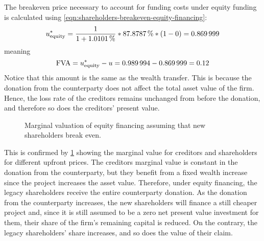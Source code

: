 \documentclass[main.tex]{subfiles}
\begin{document}
        The breakeven price necessary to account for funding costs under equity funding is calculated using
        \cref{eqn:shareholders-breakeven-equity-financing}:
            \begin{equation*}
                    u^{\ast}_{\text{equity}} 
                =
                    \frac{1}{1 + \pct{0.010101}} 
                    *
                    \pct{0.878787}
                    *
                    \left(
                        \num{1}
                        -
                        \num{0}
                    \right)
                =
                    \num{0.869999}
            \end{equation*}
        meaning 
        \begin{equation*}
            \FVA/ = u^{\ast}_{\text{equity}} - u =
            \num{0.989994}-\num{0.869999} =
            \num{0.12}
        \end{equation*}
        Notice that this amount is the same as the wealth transfer.
        This is because the donation from the counterparty does not affect the total asset value of the firm.
        Hence, the loss rate of the creditors remains unchanged from before the donation, and therefore so does the creditors' present value.

        \begin{figure}
            \centering
            \resizebox{\textwidth}{!}{%
                
            }
            \caption{
                Marginal valuation of equity financing 
                assuming that new shareholders break even.
            }
            \label{fig:marginal-value-equity-financing}
        \end{figure}

        This is confirmed by \cref{fig:marginal-value-equity-financing} showing
        the marginal value for creditors and shareholders for different upfront prices.
        The creditors marginal value is constant in the donation from the counterparty,
        but they benefit from a fixed wealth increase since the project increases the asset value.
        Therefore, under equity financing, 
        the legacy shareholders receive the entire counterparty donation.
        As the donation from the counterparty increases,
        the new shareholders will finance a still cheaper project 
        and, since it is still assumed to be a zero net present value investment for them, 
        their share of the firm's remaining capital is reduced.
        On the contrary, the legacy shareholders' share increases,
        and so does the value of their claim.
\end{document}
